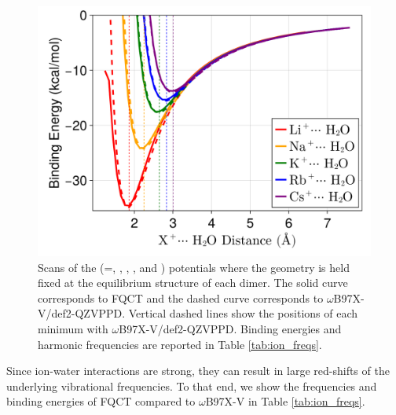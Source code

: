 \documentclass[journal=jacsat,manuscript=article]{achemso}
\begin{document}
\begin{figure}[h]
  \includegraphics*[width=\textwidth]{figures/cation_dimer_scans.png}
  \caption{Scans of the  (=, , , , and )
  potentials where the geometry is held fixed at the equilibrium structure of each dimer.
  The solid curve corresponds to FQCT and the dashed curve corresponds to $\omega$B97X-V/def2-QZVPPD.
  Vertical dashed lines show the positions of each minimum with $\omega$B97X-V/def2-QZVPPD.
  Binding energies and harmonic frequencies are reported in Table \ref{tab:ion_freqs}.
  }\label{fig:alkali_scans}
\end{figure}


Since ion-water interactions are strong, they can result in large red-shifts
of the underlying vibrational frequencies. To that end, we show the frequencies and
binding energies of FQCT compared to $\omega$B97X-V in Table \ref{tab:ion_freqs}.
\end{document}
